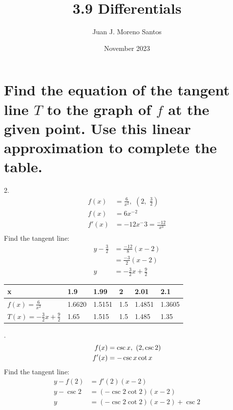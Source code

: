 \documentclass[11pt]{article}
\newcommand*{\vs}{\vspace{1cm}}
\newcommand*{\next}{\noindent}
\newcommand*{\set}{\setcounter{equation}{0}}
\begin{document}
\title{3.9 Differentials}
\author{Juan J. Moreno Santos}
\date{November 2023}

\maketitle
\section{Find the equation of the tangent line $T$ to the graph of $f$ at the given point. Use this linear approximation to complete the table.}
2.\begin{align}
    f(x)&=\frac{6}{x^2},\,\,\left(2,\,\,\frac{3}{2}\right)\\
    f(x)&=6x^{-2}\\
    f'(x)&=-12x^-3=\frac{-12}{x^3}\\
\end{align}
Find the tangent line:
\begin{align}
    y-\frac{3}{2}&=\frac{-12}{8}(x-2)\\
    &=\frac{-3}{2}(x-2)\\
    y&=-\frac{3}{2}x+\frac{9}{2}
\end{align}

\begin{flushleft}
    \begin{table}[h]
        \begin{tabular}{|l|l|l|l|l|l|}
        \hline
            x & 1.9 & 1.99 & 2 & 2.01 & 2.1\\\hline
            $f(x)=\frac{6}{x^2}$ & 1.6620 & 1.5151 & 1.5 & 1.4851 & 1.3605\\\hline
            $T(x)=-\frac{3}{2}x+\frac{9}{2}$ & 1.65 & 1.515 & 1.5 & 1.485 & 1.35\\
        \hline
        \end{tabular}
    \end{table}
\end{flushleft}

\vs\next
6.\begin{align}
    \set
f(x)&=\csc x,\,\,(2,\csc 2)\\
f'(x)&=-\csc x\cot x\\
\end{align}
Find the tangent line:
\begin{align}
y-f(2)&=f'(2)(x-2)\\
y-\csc 2&=(-\csc 2\cot 2)(x-2)\\
y&=(-\csc 2\cot 2)(x-2)+\csc 2
\end{align}
\end{document}
